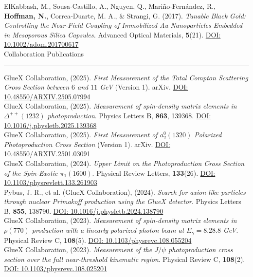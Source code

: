 \documentclass[letterpaper,11pt,oneside]{article}
\newcommand{\sectionheader}[1]{%
{\Large{#1}}
\vspace{2ex}
\hrule
\vspace{2ex}
}
\begin{document}
ElKabbash, M., Sousa‐Castillo, A., Nguyen, Q., Mariño‐Fernández, R., \textbf{Hoffman, N.}, Correa‐Duarte, M. A., \& Strangi, G. (2017). \textit{Tunable Black Gold: Controlling the Near‐Field Coupling of Immobilized Au Nanoparticles Embedded in Mesoporous Silica Capsules.} Advanced Optical Materials, \textbf{5}(21). \href{https://doi.org/10.1002/adom.201700617}{DOI: 10.1002/adom.201700617}\\

\sectionheader{Collaboration Publications}
GlueX Collaboration, (2025). \textit{First Measurement of the Total Compton Scattering Cross Section between $6$ and $11$ GeV} (Version 1). arXiv. \href{https://doi.org/10.48550/ARXIV.2505.07994}{DOI: 10.48550/ARXIV.2505.07994}\\

GlueX Collaboration, (2025). \textit{Measurement of spin-density matrix elements in $\Delta^{++}(1232)$ photoproduction}. Physics Letters B, \textbf{863}, 139368. \href{https://doi.org/10.1016/j.physletb.2025.139368}{DOI: 10.1016/j.physletb.2025.139368}\\

GlueX Collaboration, (2025). \textit{First Measurement of $a^0_2(1320)$ Polarized Photoproduction Cross Section} (Version 1). arXiv. \href{https://doi.org/10.48550/ARXIV.2501.03091}{DOI: 10.48550/ARXIV.2501.03091}\\

GlueX Collaboration, (2024). \textit{Upper Limit on the Photoproduction Cross Section of the Spin-Exotic $\pi_1(1600)$}. Physical Review Letters, \textbf{133}(26). \href{https://doi.org/10.1103/physrevlett.133.261903}{DOI: 10.1103/physrevlett.133.261903}\\

Pybus, J. R., et al. (GlueX Collaboration), (2024). \textit{Search for axion-like particles through nuclear Primakoff production using the GlueX detector}. Physics Letters B, \textbf{855}, 138790. \href{https://doi.org/10.1016/j.physletb.2024.138790}{DOI: 10.1016/j.physletb.2024.138790}\\

GlueX Collaboration, (2023). \textit{Measurement of spin-density matrix elements in $\rho(770)$ production with a linearly polarized photon beam at $E_{\gamma} = 8.2$\textemdash $8.8$ GeV}. Physical Review C, \textbf{108}(5). \href{https://doi.org/10.1103/physrevc.108.055204}{DOI: 10.1103/physrevc.108.055204}\\

GlueX Collaboration, (2023). \textit{Measurement of the $J/\psi$ photoproduction cross section over the full near-threshold kinematic region}. Physical Review C, \textbf{108}(2). \href{https://doi.org/10.1103/physrevc.108.025201}{DOI: 10.1103/physrevc.108.025201}\\
\end{document}
